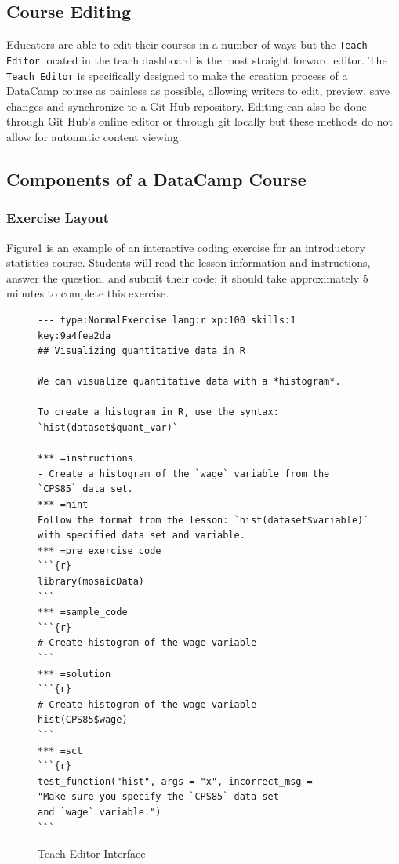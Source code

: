 \documentclass[12pt]{article}\usepackage[]{graphicx}\usepackage[]{color}
\begin{document}
\subsection{Course Editing}
Educators are able to edit their courses in a number of ways but the \texttt{Teach Editor} located in the teach dashboard is the
most straight forward editor. The \texttt{Teach Editor} is specifically designed to make the creation process of a DataCamp course
as painless as possible, allowing writers to edit, preview, save changes and synchronize to a Git Hub repository. Editing can
also be done through Git Hub's online editor or through git locally but these methods do not allow for automatic content
viewing.
\subsection{Components of a DataCamp Course}
\subsubsection{Exercise Layout}
Figure1 is an example of an interactive coding exercise for an introductory statistics course. Students will read the lesson information and instructions, answer the question, and submit their code; it should take approximately 5 minutes to complete this exercise.
\begin{figure}
\caption{Teach Editor Interface}
\begin{Verbatim}[frame=single]
--- type:NormalExercise lang:r xp:100 skills:1 key:9a4fea2da
## Visualizing quantitative data in R

We can visualize quantitative data with a *histogram*.

To create a histogram in R, use the syntax:
`hist(dataset$quant_var)`

*** =instructions
- Create a histogram of the `wage` variable from the 
`CPS85` data set.
*** =hint
Follow the format from the lesson: `hist(dataset$variable)`
with specified data set and variable.
*** =pre_exercise_code
```{r}
library(mosaicData)
```
*** =sample_code
```{r}
# Create histogram of the wage variable
```
*** =solution
```{r}
# Create histogram of the wage variable 
hist(CPS85$wage)
```
*** =sct
```{r}
test_function("hist", args = "x", incorrect_msg = 
"Make sure you specify the `CPS85` data set
and `wage` variable.")
```
\end{Verbatim}
\label{fig:code1}
\end{figure}
\end{document}
